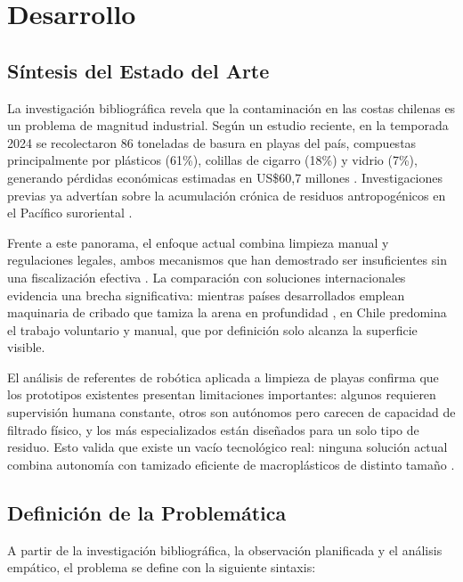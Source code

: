 \documentclass[12pt, letterpaper]{article}
\begin{document}
\newpage
\section{Desarrollo}

\subsection{Síntesis del Estado del Arte}

La investigación bibliográfica revela que la contaminación en las costas chilenas
es un problema de magnitud industrial. Según un estudio reciente, en la temporada
2024 se recolectaron 86 toneladas de basura en playas del país, compuestas principalmente
por plásticos (61\%), colillas de cigarro (18\%) y vidrio (7\%), generando pérdidas
económicas estimadas en US\$60,7 millones \parencite{oceana_2026}.
Investigaciones previas ya advertían sobre la acumulación crónica de residuos
antropogénicos en el Pacífico suroriental \parencite{bravo_2009}.

Frente a este panorama, el enfoque actual combina limpieza manual y regulaciones legales,
ambos mecanismos que han demostrado ser insuficientes sin una fiscalización efectiva
\parencite{radio_uchile_2025}. La comparación con soluciones internacionales evidencia
una brecha significativa: mientras países desarrollados emplean maquinaria de cribado
que tamiza la arena en profundidad \parencite{beachtech_2020}, en Chile predomina el
trabajo voluntario y manual, que por definición solo alcanza la superficie visible.

El análisis de referentes de robótica aplicada a limpieza de playas \parencite{publimetro_2024}
confirma que los prototipos existentes presentan limitaciones importantes: algunos requieren
supervisión humana constante, otros son autónomos pero carecen de capacidad de filtrado
físico, y los más especializados están diseñados para un solo tipo de residuo.
Esto valida que existe un vacío tecnológico real: ninguna solución actual combina
autonomía con tamizado eficiente de macroplásticos de distinto tamaño
\parencite{garcia_dominguez_2021}.

\subsection{Definición de la Problemática}

A partir de la investigación bibliográfica, la observación planificada y el análisis
empático, el problema se define con la siguiente sintaxis:
\end{document}
